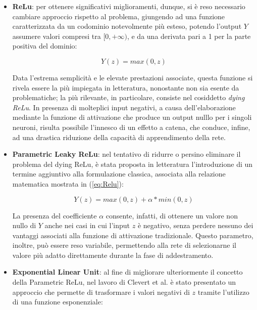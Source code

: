 \begin{itemize}
    Ad ogni modo, sebbene dei passi avanti siano evidenti, questa formulazione non permette di risolvere completamente i problemi riscontrati con le precedenti funzioni. 

    \item \textbf{ReLu}: per ottenere significativi miglioramenti, dunque, si è reso necessario cambiare approccio rispetto al problema, giungendo ad una funzione caratterizzata da un codominio notevolmente più esteso, potendo l'output $Y$ assumere valori compresi tra $[0, +\infty)$, e da una derivata pari a 1 per la parte positiva del dominio:
    
        \begin{equation}
            Y(z) = max(0, z)
            \label{eq:Relu}
        \end{equation}
    
    Data l'estrema semplicità e le elevate prestazioni associate, questa funzione si rivela essere la più impiegata in letteratura, nonostante non sia esente da problematiche; la più rilevante, in particolare, consiste nel cosiddetto \textit{dying ReLu}. In presenza di molteplici input negativi, a causa dell'elaborazione mediante la funzione di attivazione che produce un output nulllo per i singoli neuroni, risulta possibile l'innesco di un effetto a catena, che conduce, infine, ad una drastica riduzione della capacità di apprendimento della rete.   
    
    \item \textbf{Parametric Leaky ReLu}: nel tentativo di ridurre o persino eliminare il problema del dying ReLu, è stata proposta in letteratura l'introduzione di un termine aggiuntivo alla formulazione classica, associata alla relazione matematica mostrata in (\ref{eq:Relu}):
    
        \begin{equation}
            Y(z) = max(0, z) + \alpha * min(0, z)
            \label{eq:Leaky_Relu}
        \end{equation}

    La presenza del coefficiente $\alpha$ consente, infatti, di ottenere un valore non nullo di $Y$ anche nei casi in cui l'input $z$ è negativo, senza perdere nessuno dei vantaggi associati alla funzione di attivazione tradizionale. Questo parametro, inoltre, può essere reso variabile, permettendo alla rete di selezionarne il valore più adatto direttamente durante la fase di addestramento. 
    
    \item \textbf{Exponential Linear Unit}: al fine di migliorare ulteriormente il concetto della Parametric ReLu, nel lavoro di Clevert et al.\cite{ELU} è stato presentato un approccio che permette di trasformare i valori negativi di $z$ tramite l'utilizzo di una funzione esponenziale:
    

\end{itemize}

